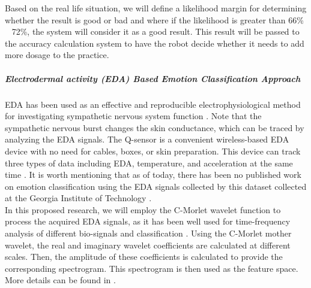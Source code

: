 \documentclass[12pt]{report}
\begin{document}
Based on the real life situation, we will define a likelihood margin for determining whether the result
is good or bad and where if the likelihood is greater than 66\% ~ 72\%, the system will consider it 
as a good result. This result will be passed to the accuracy calculation system to have the robot 
decide whether it needs to add more dosage to the practice.\\


\subparagraph{Electrodermal activity (EDA) Based Emotion Classification Approach} 
EDA has been used as an effective and reproducible electrophysiological method for 
investigating sympathetic nervous system function \cite{WearableDevice2016, AssociationBetween2013, SympatheticSkin1984, PrincipalComponent2000}. Note that the sympathetic nervous 
burst changes the skin conductance, which can be traced by analyzing the EDA signals\cite{SkinConduct2006, SympatheticSkin1981, DecodeChild2013}. The Q-sensor 
is a convenient wireless-based EDA device with no need for cables, boxes, or skin 
preparation. This device can track three types of data including EDA, temperature, 
and acceleration at the same time \cite{Validation2013}. It is worth mentioning that 
as of today, there has been no published work on emotion classification using the 
EDA signals collected by this dataset collected at the Georgia Institute of 
Technology \cite{DecodeChild2013}.\\

In this proposed research, we will employ the C-Morlet wavelet function to process the acquired EDA 
signals, as it has been well used for time-frequency analysis of different bio-signals 
and classification \cite{MultKernel2016}. Using the C-Morlet mother wavelet, the real and imaginary wavelet coefficients are calculated at different scales. Then, the amplitude of these coefficients is calculated to provide the corresponding spectrogram. This spectrogram is then used as the feature space. More details can be found in \cite{hFeng18}.\\


\appendix

\baselineskip 0.21in


\baselineskip 0.33in
\end{document}
